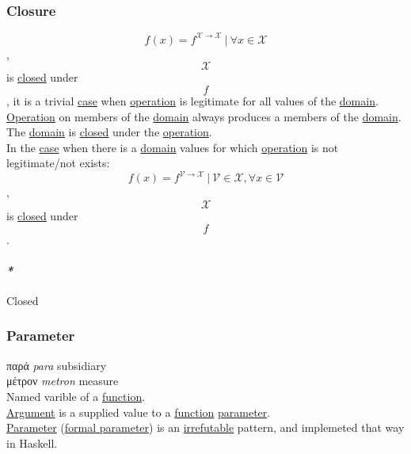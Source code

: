 \documentclass[11pt]{article}
\begin{document}
\subsubsection{\label{org89569e8}Closure}
\label{sec:org09ab8d4}
$$ f(x) = f^{\mathcal{X \to X}} \ | \ \forall x \in \mathcal{X} $$, $$ \mathcal{X} $$ is \hyperref[orgcdd7006]{closed} under $$ f $$, it is a trivial \hyperref[org41d12b6]{case} when \hyperref[org1173fe8]{operation} is legitimate for all values of the \hyperref[org494b48a]{domain}.\\

\hyperref[org1173fe8]{Operation} on members of the \hyperref[org494b48a]{domain} always produces a members of the \hyperref[org494b48a]{domain}. The \hyperref[org494b48a]{domain} is \hyperref[orgcdd7006]{closed} under the \hyperref[org1173fe8]{operation}.\\

In the \hyperref[org41d12b6]{case} when there is a \hyperref[org494b48a]{domain} values for which \hyperref[org1173fe8]{operation} is not legitimate/not exists:\\

$$ f(x) = f^{\mathcal{V \to X}} \ | \ \mathcal{V \in X}, \forall x \in \mathcal{V} $$, $$ \mathcal{X} $$ is \hyperref[orgcdd7006]{closed} under $$ f $$.\\

\paragraph{\emph{*}}
\label{sec:org677701f}

\label{orgcdd7006}Closed\\

\subsubsection{\label{org0e7674e}Parameter}
\label{sec:org97ddee7}
παρά \emph{para} subsidiary\\
μέτρον \emph{metron} measure\\

Named varible of a \hyperref[orge15bc14]{function}.\\

\hyperref[orga6b7e97]{Argument} is a supplied value to a \hyperref[orge15bc14]{function} \hyperref[org0e7674e]{parameter}.\\

\hyperref[org0e7674e]{Parameter} (\hyperref[org821c357]{formal parameter}) is an \hyperref[org5f9dad8]{irrefutable} pattern, and implemeted that way in Haskell.\\
\end{document}
